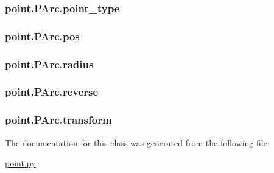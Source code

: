 \subsubsection[{point\+\_\+type}]{\setlength{\rightskip}{0pt plus 5cm}point.\+P\+Arc.\+point\+\_\+type}\label{classpoint_1_1_p_arc_ab8c6246d191ebc6d342a6e339d91759e}
\hypertarget{classpoint_1_1_p_arc_a63d062c53f0c2232c0ff29fbc490b820}{}
\subsubsection[{pos}]{\setlength{\rightskip}{0pt plus 5cm}point.\+P\+Arc.\+pos}\label{classpoint_1_1_p_arc_a63d062c53f0c2232c0ff29fbc490b820}
\hypertarget{classpoint_1_1_p_arc_a8b8a7011a622c35fdaef3e1a684281f5}{}
\subsubsection[{radius}]{\setlength{\rightskip}{0pt plus 5cm}point.\+P\+Arc.\+radius}\label{classpoint_1_1_p_arc_a8b8a7011a622c35fdaef3e1a684281f5}
\hypertarget{classpoint_1_1_p_arc_a052f5ccae99936b8d39120d398a9c7ff}{}
\subsubsection[{reverse}]{\setlength{\rightskip}{0pt plus 5cm}point.\+P\+Arc.\+reverse}\label{classpoint_1_1_p_arc_a052f5ccae99936b8d39120d398a9c7ff}
\hypertarget{classpoint_1_1_p_arc_a1e706569aa26185265004dd619ffe0ef}{}
\subsubsection[{transform}]{\setlength{\rightskip}{0pt plus 5cm}point.\+P\+Arc.\+transform}\label{classpoint_1_1_p_arc_a1e706569aa26185265004dd619ffe0ef}


The documentation for this class was generated from the following file\+:\begin{DoxyCompactItemize}
\item 
\hyperlink{point_8py}{point.\+py}\end{DoxyCompactItemize}
